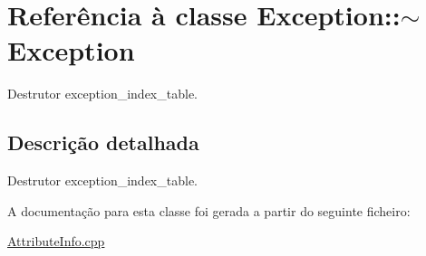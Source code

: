 \hypertarget{class_exception_1_1~_exception}{}\section{Referência à classe Exception\+:\+:$\sim$\+Exception}
\label{class_exception_1_1~_exception}


Destrutor exception\+\_\+index\+\_\+table.  




\subsection{Descrição detalhada}
Destrutor exception\+\_\+index\+\_\+table. 

A documentação para esta classe foi gerada a partir do seguinte ficheiro\+:\begin{DoxyCompactItemize}
\item 
\hyperlink{_attribute_info_8cpp}{Attribute\+Info.\+cpp}\end{DoxyCompactItemize}
